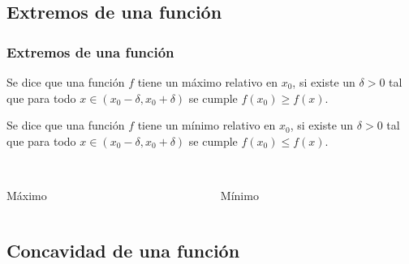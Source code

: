 \subsection{Extremos de una función}
\begin{frame}
\frametitle{Extremos de una función}
\begin{definicion}
Se dice que una función $f$ tiene un máximo relativo en $x_0$, si existe un $\delta>0$ tal que para todo $x\in
(x_0-\delta,x_0+\delta)$ se cumple $f(x_0)\geq f(x)$.

Se dice que una función $f$ tiene un mínimo relativo en $x_0$, si existe un $\delta>0$ tal que para todo $x\in
(x_0-\delta,x_0+\delta)$ se cumple $f(x_0)\leq f(x)$.
\end{definicion}

\begin{columns}
\begin{column}{0.4\textwidth}
\begin{center}
\scalebox{1}{}\\
\color{red}Máximo
\end{center}
\end{column}
\begin{column}{0.4\textwidth}
\begin{center}
\scalebox{1}{}\\
\color{red}Mínimo
\end{center}
\end{column}
\end{columns}
\end{frame} 


\subsection{Concavidad de una función}

